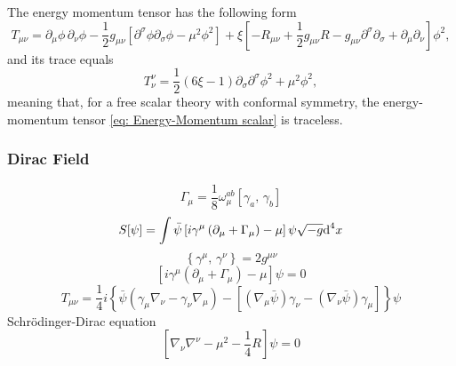 The energy momentum tensor has the following form
\begin{equation}\label{eq: Energy-Momentum scalar}
	T_{\mu\nu}=\partial_\mu\phi\,\partial_\nu\phi -\frac{1}{2}g_{\mu\nu}\left[\partial^\sigma\phi\partial_\sigma\phi-\mu^2\phi^2\right]+\xi\left[-R_{\mu\nu}+\frac{1}{2}g_{\mu\nu}R-g_{\mu\nu}\partial^\sigma\partial_\sigma+\partial_\mu\partial_\nu\right]\phi^2,
\end{equation}
and its trace equals
\begin{equation}
	T^\nu_\nu=\frac{1}{2}\left(6\xi-1\right)\partial_\sigma\partial^\sigma\phi^2+\mu^2\phi^2,
\end{equation}
meaning that, for a free scalar theory with conformal symmetry, the energy-momentum tensor \ref{eq: Energy-Momentum scalar} is traceless.
\subsubsection{Dirac Field}
\begin{equation}
	\Gamma_\mu=\frac{1}{8}\omega_{\mu}^{ab}\left[\gamma_a,\,\gamma_b\right]
\end{equation}
\begin{equation}
	S[\psi]=\int \bar{\psi}\left[i\gamma^\mu\left(\partial_\mu+\Gamma_\mu\right)-\mu\right]\psi\sqrt{-g}\text{d}^4x
\end{equation}
\begin{equation}
	\left\{\gamma^\mu,\,\gamma^\nu\right\}=2g^{\mu\nu}
\end{equation}
\begin{equation}
	\left[i\gamma^\mu\left(\partial_\mu+\Gamma_\mu\right)-\mu\right]\psi=0
\end{equation}
\begin{equation}
	T_{\mu\nu}=\frac{1}{4}i\left\{\bar{\psi}\left(\gamma_\mu\nabla_\nu-\gamma_\nu\nabla_\mu\right)-\left[\left(\nabla_\mu\bar{\psi}\right)\gamma_\nu-\left(\nabla_\nu\bar{\psi}\right)\gamma_\mu\right]\right\}\psi
\end{equation}
Schrödinger-Dirac equation
\begin{equation}
	\left[\nabla_\nu\nabla^\nu-\mu^2-\frac{1}{4}R\right]\psi=0
\end{equation}

